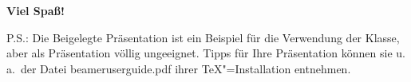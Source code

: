 \begin{frame}
  \begin{block}{}
    \centerline{\huge\textbf{Viel Spaß!}}
  \end{block}
  \vfill P.S.: Die Beigelegte Präsentation ist ein Beispiel für die
  Verwendung der Klasse, aber als Präsentation völlig
  ungeeignet. Tipps für Ihre Präsentation können sie u.\,a.\ der Datei
  beameruserguide.pdf ihrer \TeX"=Installation entnehmen.
\end{frame}


